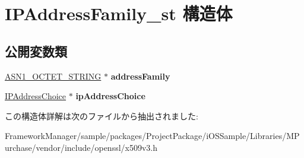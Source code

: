 \hypertarget{struct_i_p_address_family__st}{}\section{I\+P\+Address\+Family\+\_\+st 構造体}
\label{struct_i_p_address_family__st}
\subsection*{公開変数類}
\begin{DoxyCompactItemize}
\item 
\hypertarget{struct_i_p_address_family__st_ae57c9a03c3c674742caa8a3ddb51c72c}{}\hyperlink{structasn1__string__st}{A\+S\+N1\+\_\+\+O\+C\+T\+E\+T\+\_\+\+S\+T\+R\+I\+N\+G} $\ast$ {\bfseries address\+Family}\label{struct_i_p_address_family__st_ae57c9a03c3c674742caa8a3ddb51c72c}

\item 
\hypertarget{struct_i_p_address_family__st_ab28cfcf9556e80a657083c93c2fd3eef}{}\hyperlink{struct_i_p_address_choice__st}{I\+P\+Address\+Choice} $\ast$ {\bfseries ip\+Address\+Choice}\label{struct_i_p_address_family__st_ab28cfcf9556e80a657083c93c2fd3eef}

\end{DoxyCompactItemize}


この構造体詳解は次のファイルから抽出されました\+:\begin{DoxyCompactItemize}
\item 
Framework\+Manager/sample/packages/\+Project\+Package/i\+O\+S\+Sample/\+Libraries/\+M\+Purchase/vendor/include/openssl/x509v3.\+h\end{DoxyCompactItemize}
